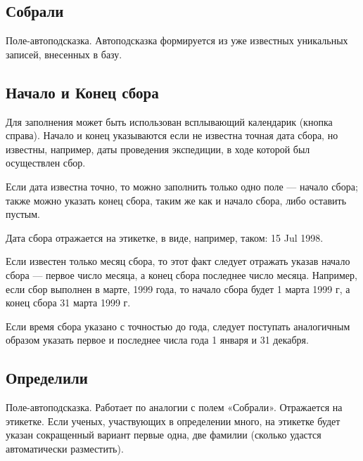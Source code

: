 \documentclass[letterpaper,10pt,russian]{sphinxmanual}
\begin{document}
\ignorespaces 

\subsection{Собрали}
\label{\detokenize{main:id29}}\label{\detokenize{main:index-25}}
Поле-автоподсказка. Автоподсказка формируется из уже известных
уникальных записей, внесенных в базу.

\ignorespaces 

\subsection{Начало и Конец сбора}
\label{\detokenize{main:index-26}}\label{\detokenize{main:id30}}
Для заполнения может быть использован всплывающий календарик (кнопка справа).
Начало и конец указываются если не известна точная дата сбора, но известны,
например, даты проведения экспедиции, в ходе которой был осуществлен сбор.

Если дата известна точно, то можно заполнить только одно поле — начало сбора;
также можно указать конец сбора, таким же как и начало сбора, либо оставить пустым.

Дата сбора отражается на этикетке, в виде, например, таком: 15 Jul 1998.

Если известен только месяц сбора, то этот факт следует отражать указав начало
сбора — первое число месяца, а конец сбора \textendash{} последнее число месяца.
Например, если сбор выполнен в марте, 1999 года, то начало сбора будет
1 марта 1999 г, а конец сбора \textendash{} 31 марта 1999 г.

Если время сбора указано с точностью до года, следует поступать аналогичным
образом \textendash{} указать первое и последнее числа года \textendash{} 1 января и 31 декабря.

\ignorespaces 

\subsection{Определили}
\label{\detokenize{main:id31}}\label{\detokenize{main:index-27}}
Поле-автоподсказка. Работает  по аналогии с полем «Собрали».
Отражается на этикетке. Если ученых, участвующих в определении много, на
этикетке будет указан сокращенный вариант \textendash{} первые одна,
две фамилии (сколько удастся автоматически разместить).

\ignorespaces 
\end{document}
